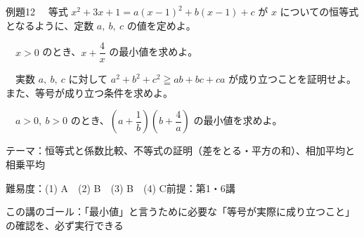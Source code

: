 \documentclass[paper=b5j, fontsize=8pt, fleqn, twoside]{jlreq}
\begin{document}
\begin{ascolorbox4A}[出典：オリジナル]{例題12}
  　等式 $x^2+3x+1=a(x-1)^2+b(x-1)+c$ が $x$ についての恒等式となるように、定数 $a,\ b,\ c$ の値を定めよ。\par
  　$x>0$ のとき、$x+\dfrac4x$ の最小値を求めよ。\par
  　実数 $a,\ b,\ c$ に対して $a^2+b^2+c^2\geqq ab+bc+ca$ が成り立つことを証明せよ。また、等号が成り立つ条件を求めよ。\par
  　$a>0,\ b>0$ のとき、$\left(a+\dfrac1b\right)\left(b+\dfrac4a\right)$ の最小値を求めよ。
\end{ascolorbox4A}

\begin{Data}
  テーマ：恒等式と係数比較、不等式の証明（差をとる・平方の和）、相加平均と相乗平均\par
  難易度：(1) A　(2) B　(3) B　(4) C\quad 前提：第1・6講\par
  この講のゴール：「最小値」と言うために必要な「等号が実際に成り立つこと」の確認を、必ず実行できる
\end{Data}
\end{document}
